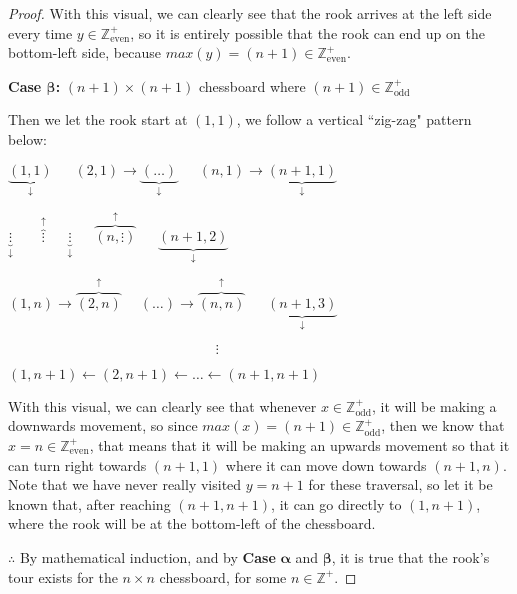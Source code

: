\documentclass[12pt]{article}
\begin{document}
\begin{enumerate}[label=Part \Alph*)]
\begin{proof}[Proof]
		
		With this visual, we can clearly see that the rook arrives at the left side every time $y \in \mathbb{Z}_{\text{even}}^{+}$, so it is entirely possible that the rook can end up on the bottom-left side, because $max(y) = (n + 1) \in \mathbb{Z}_{\text{even}}^{+}$.
 
        \textbf{Case $\boldsymbol{\beta}$:} $(n + 1) \times (n + 1)$ chessboard where $(n + 1) \in \mathbb{Z}_{\text{odd}}^{+}$
        
        Then we let the rook start at $(1, 1)$,  we follow a vertical ``zig-zag" pattern below:
        
        
        \begin{minipage}{\linewidth}
        \begin{center}
        $\underbrace{(1, 1)}_{\downarrow} \quad\;\; (2, 1) \rightarrow \underbrace{(\ldots)}_{\downarrow} \quad\;\; (n, 1) \rightarrow \underbrace{(n + 1, 1)}_{\downarrow}$
        
		$\underbrace{\vdots}_{\downarrow} \quad\quad \overbrace{\vdots}^{\uparrow} \quad\;\; \underbrace{\vdots}_{\downarrow} \quad\;\;  \overbrace{(n, \vdots )}^{\uparrow} \quad\;\; \underbrace{(n + 1, 2)}_{\downarrow}$
		
		$(1, n) \rightarrow \overbrace{(2, n)}^{\uparrow} \quad\; (\ldots) \rightarrow \overbrace{(n, n)}^{\uparrow} \quad\;\; \underbrace{(n + 1, 3)}_{\downarrow}$
		
		$\hspace{178pt}\vdots\hspace{0pt}$
		
		$(1, n + 1) \leftarrow (2, n + 1) \leftarrow \ldots \leftarrow (n + 1, n + 1)$
		\end{center}
		\end{minipage}
		
		
		With this visual, we can clearly see that whenever $x \in \mathbb{Z}_{\text{odd}}^{+}$, it will be making a downwards movement, so since $max(x) = (n + 1) \in \mathbb{Z}_{\text{odd}}^{+}$, then we know that $x = n \in \mathbb{Z}_{\text{even}}^{+}$, that means that it will be making an upwards movement so that it can turn right towards $(n + 1, 1)$ where it can move down towards $(n+1, n)$. Note that we have never really visited $y = n + 1$ for these traversal, so let it be known that, after reaching $(n + 1, n + 1)$, it can go directly to $(1, n+1)$, where the rook will be at the bottom-left of the chessboard.
        
        $\therefore$ By mathematical induction, and by \textbf{Case} $\boldsymbol{\alpha}$ and $\boldsymbol{\beta}$, it is true that the rook's tour exists for the $n \times n$ chessboard, for some $n \in \mathbb{Z}^{+}$.
    \end{proof}
    

\end{enumerate}
\end{document}
